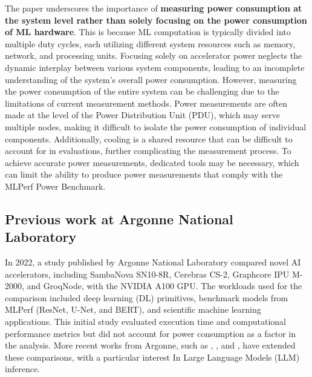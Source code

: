 \documentclass[conference]{IEEEtran}
\begin{document}
The paper underscores the importance of \textbf{measuring power consumption at the system level rather than solely focusing on the power consumption of ML hardware}. This is because ML computation is typically divided into multiple duty cycles, each utilizing different system resources such as memory, network, and processing units. Focusing solely on accelerator power neglects the dynamic interplay between various system components, leading to an incomplete understanding of the system's overall power consumption.
However, measuring the power consumption of the entire system can be challenging due to the limitations of current measurement methods. Power measurements are often made at the level of the Power Distribution Unit (PDU), which may serve multiple nodes, making it difficult to isolate the power consumption of individual components. Additionally, cooling is a shared resource that can be difficult to account for in evaluations, further complicating the measurement process.
To achieve accurate power measurements, dedicated tools may be necessary, which can limit the ability to produce power measurements that comply with the MLPerf Power Benchmark.

\subsection{Previous work at Argonne National Laboratory}
In 2022, a study published by Argonne National Laboratory \cite{Emani2021} compared novel AI accelerators, including SambaNova SN10-8R, Cerebras CS-2, Graphcore IPU M-2000, and GroqNode, with the NVIDIA A100 GPU. The workloads used for the comparison included deep learning (DL) primitives, benchmark models from MLPerf (ResNet, U-Net, and BERT), and scientific machine learning applications. This initial study evaluated execution time and computational performance metrics but did not account for power consumption as a factor in the analysis.
More recent works from Argonne, such as \cite{Emani2022}, \cite{Emani2024}, and \cite{LLMInfbench}, have extended these comparisons, with a particular interest In Large Language Models (LLM) inference. 
\end{document}
